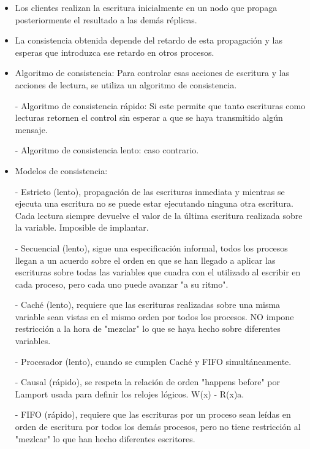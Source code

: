 \documentclass[12pt]{amsart}
\begin{document}
    \begin{itemize}
        \item Los clientes realizan la escritura inicialmente en un nodo que propaga posteriormente el resultado a las demás réplicas.
        \item La consistencia obtenida depende del retardo de esta propagación y las esperas que introduzca ese retardo en otros procesos.
        \item Algoritmo de consistencia: Para controlar esas acciones de escritura y las acciones de lectura, se utiliza un algoritmo de consistencia.
        
        - Algoritmo de consistencia rápido: Si este permite que tanto escrituras como lecturas retornen el control sin esperar a que se haya transmitido algún mensaje.
        
        - Algoritmo de consistencia lento: caso contrario.
        
        \item Modelos de consistencia:
        
        - Estricto (lento), propagación de las escrituras inmediata y mientras se ejecuta una escritura no se puede estar ejecutando ninguna otra escritura. Cada lectura siempre devuelve el valor de la última escritura realizada sobre la variable. Imposible de implantar.
        
        - Secuencial (lento), sigue una especificación informal, todos los procesos llegan a un acuerdo sobre el orden en que se han llegado a aplicar las escrituras sobre todas las variables que cuadra con el utilizado al escribir en cada proceso, pero cada uno puede avanzar "a su ritmo".
        
        - Caché (lento), requiere que las escrituras realizadas sobre una misma variable sean vistas en el mismo orden por todos los procesos. NO impone restricción a la hora de "mezclar" lo que se haya hecho sobre diferentes variables.
        
        - Procesador (lento), cuando se cumplen Caché y FIFO simultáneamente.
        
        - Causal (rápido), se respeta la relación de orden "happens before" por Lamport usada para definir los relojes lógicos. W(x) - R(x)a.
        
        - FIFO (rápido), requiere que las escrituras por un proceso sean leídas en orden de escritura por todos los demás procesos, pero no tiene restricción al "mezlcar" lo que han hecho diferentes escritores.
        

\end{itemize}
\end{document}
